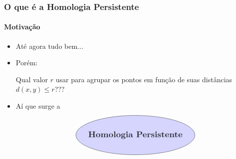 \documentclass[11pt]{beamer}
\theoremstyle{remark}
\theoremstyle{definition}
\theoremstyle{plain}
\begin{document}
    \begin{frame}
        \frametitle{O que é a Homologia Persistente}
        \framesubtitle{Motivação}

        \begin{itemize}
            \item
                Até agora tudo bem...

            \item
                Porém:

                \begin{center}
                    Qual valor $r$ usar para agrupar os pontos em função
                    de suas distâncias $d(x,y) \leq r$???
                \end{center}

            \item
                Aí que surge a 
                \[
                \begin{tikzpicture}
                    \draw[fill=blue!20!white, opacity=0.8]
                        (0,0) ellipse (3cm and 1cm) node[midway, scale=1.2] 
                        {\textbf{Homologia Persistente}};
                \end{tikzpicture}
                \]

        \end{itemize}

    \end{frame}
\end{document}
